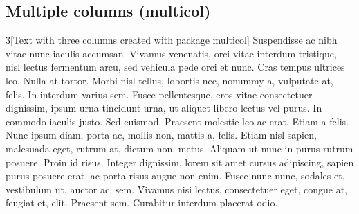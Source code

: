 %

\subsection{Multiple columns (multicol)}

\begin{filecontents*}{\democodefile}
\begin{multicols}{3}[Text with three columns created with package multicol]
Suspendisse ac nibh vitae nunc iaculis accumsan. Vivamus venenatis, orci vitae
interdum tristique, nisl lectus fermentum arcu, sed vehicula pede orci et
nunc. Cras tempus ultrices leo. Nulla at tortor. Morbi nisl tellus, lobortis
nec, nonummy a, vulputate at, felis. In interdum varius sem. Fusce
pellentesque, eros vitae consectetuer dignissim, ipsum urna tincidunt urna,
ut aliquet libero lectus vel purus. In commodo iaculis justo. Sed euismod.
Praesent molestie leo ac erat. Etiam a felis.
Nunc ipsum diam, porta ac, mollis non, mattis a, felis. Etiam nisl sapien,
malesuada eget, rutrum at, dictum non, metus. Aliquam ut nunc in purus rutrum
posuere. Proin id risus. Integer dignissim, lorem sit amet cursus adipiscing,
sapien purus posuere erat, ac porta risus augue non enim. Fusce nunc nunc,
sodales et, vestibulum ut, auctor ac, sem. Vivamus nisi lectus, consectetuer
eget, congue at, feugiat et, elit. Praesent sem. Curabitur interdum placerat
odio.
\end{multicols}
\end{filecontents*}
%
